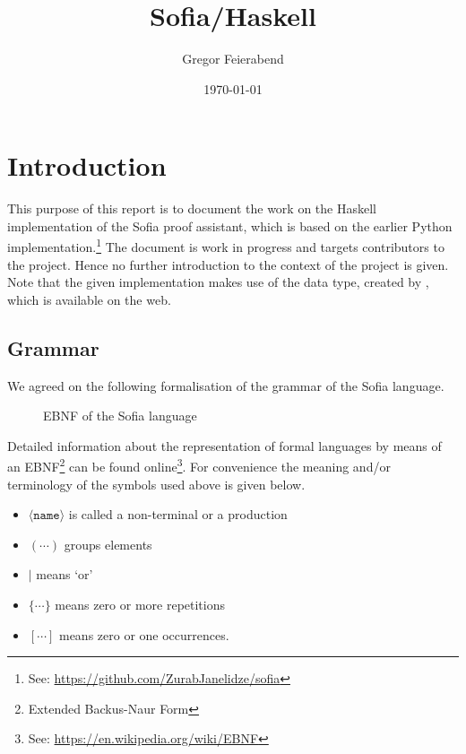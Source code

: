\documentclass[notitlepage]{report}
\title{Sofia/Haskell}
\author{Gregor Feierabend}
\date{\today}
\begin{document}

\maketitle

\begingroup
\let\clearpage\relax
\tableofcontents
\endgroup


\chapter{Introduction}
This purpose of this report is to document the work on the Haskell
implementation of the Sofia proof assistant, which is based on the earlier
Python implementation.\footnote{See: %
\url{https://github.com/ZurabJanelidze/sofia}}
The document is work in progress and targets contributors to the project. Hence
no further introduction to the context of the project is given. Note that the
given implementation makes use of the  data type, created by
\textcite{Hutton}, which is available on the web.
\section{Grammar}
We agreed on the following formalisation of the grammar of the Sofia language.
\begin{figure}[h!]
    {\renewcommand{\arraystretch}{2.0}
    }
    \caption{EBNF of the Sofia language}
\end{figure}

Detailed information about the representation of formal languages by means of an
EBNF\footnote{Extended Backus-Naur Form} can be found online\footnote{%
See: \url{https://en.wikipedia.org/wiki/EBNF}}. For convenience
the meaning and/or terminology of the symbols used above is given below.
\begin{multicols}{2}
\begin{itemize}
    \item $\langle\texttt{name}\rangle$ is called a non-terminal or a production
    \item $(\cdots)$ groups elements
    \item $|$ means `or'
    \item $\{\cdots\}$ means zero or more repetitions
    \item $[\cdots]$ means zero or one occurrences.
\end{itemize}
\end{multicols}
\end{document}
